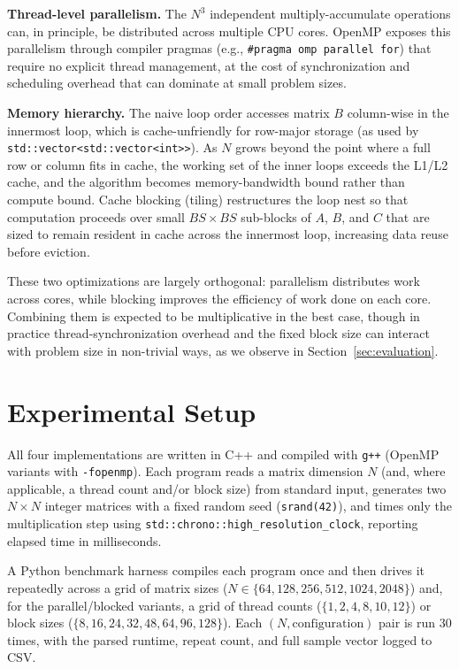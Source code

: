 \documentclass[11pt]{article}
\begin{document}
\textbf{Thread-level parallelism.} The $N^3$ independent multiply-accumulate operations can, in principle, be distributed across multiple CPU cores. OpenMP exposes this parallelism through compiler pragmas (e.g., \texttt{\#pragma omp parallel for}) that require no explicit thread management, at the cost of synchronization and scheduling overhead that can dominate at small problem sizes.

\textbf{Memory hierarchy.} The naive loop order accesses matrix $B$ column-wise in the innermost loop, which is cache-unfriendly for row-major storage (as used by \texttt{std::vector<std::vector<int>>}). As $N$ grows beyond the point where a full row or column fits in cache, the working set of the inner loops exceeds the L1/L2 cache, and the algorithm becomes memory-bandwidth bound rather than compute bound. Cache blocking (tiling) restructures the loop nest so that computation proceeds over small $BS \times BS$ sub-blocks of $A$, $B$, and $C$ that are sized to remain resident in cache across the innermost loop, increasing data reuse before eviction.

These two optimizations are largely orthogonal: parallelism distributes work across cores, while blocking improves the efficiency of work done on each core. Combining them is expected to be multiplicative in the best case, though in practice thread-synchronization overhead and the fixed block size can interact with problem size in non-trivial ways, as we observe in Section~\ref{sec:evaluation}.

\section{Experimental Setup}
\label{sec:setup}

All four implementations are written in C++ and compiled with \texttt{g++} (OpenMP variants with \texttt{-fopenmp}). Each program reads a matrix dimension $N$ (and, where applicable, a thread count and/or block size) from standard input, generates two $N \times N$ integer matrices with a fixed random seed (\texttt{srand(42)}), and times only the multiplication step using \texttt{std::chrono::high\_resolution\_clock}, reporting elapsed time in milliseconds.

A Python benchmark harness compiles each program once and then drives it repeatedly across a grid of matrix sizes ($N \in \{64, 128, 256, 512, 1024, 2048\}$) and, for the parallel/blocked variants, a grid of thread counts ($\{1,2,4,8,10,12\}$) or block sizes ($\{8,16,24,32,48,64,96,128\}$). Each $(N, \text{configuration})$ pair is run 30 times, with the parsed runtime, repeat count, and full sample vector logged to CSV.
\end{document}
